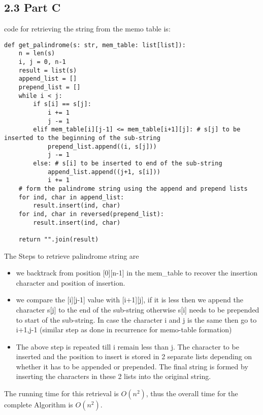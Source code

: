 \documentclass[12pt]{article}
\begin{document}
\subsection*{2.3 Part C}
\vspace{10pt}
code for retrieving the string from the memo table is:
\begin{verbatim}
def get_palindrome(s: str, mem_table: list[list]):
    n = len(s) 
    i, j = 0, n-1
    result = list(s)
    append_list = []
    prepend_list = []
    while i < j:
        if s[i] == s[j]:
            i += 1
            j -= 1
        elif mem_table[i][j-1] <= mem_table[i+1][j]: # s[j] to be inserted to the beginning of the sub-string
            prepend_list.append((i, s[j]))
            j -= 1
        else: # s[i] to be inserted to end of the sub-string
            append_list.append((j+1, s[i]))
            i += 1
    # form the palindrome string using the append and prepend lists
    for ind, char in append_list:
        result.insert(ind, char)
    for ind, char in reversed(prepend_list):
        result.insert(ind, char)

    return "".join(result)
\end{verbatim}
The Steps to retrieve palindrome string are 
\begin{itemize}
  \item we backtrack from position [0][n-1] in the mem\_table to recover the insertion character and position of insertion. 
  \item we compare the [i][j-1] value with [i+1][j], if it is less then we append the character s[j] to the end of the sub-string otherwise s[i] needs to be prepended to start of the sub-string. In case the character i and j is the same then go to i+1,j-1 (similar step as done in recurrence for memo-table formation)
  \item The above step is repeated till i remain less than j. The character to be inserted and the position to insert is stored in 2 separate lists depending on whether it has to be appended or prepended. The final string is formed by inserting the characters in these 2 lists into the original string.
\end{itemize}

The running time for this retrieval is \(O(n^2)\), thus the overall time for the complete Algorithm is \(O(n^2)\).
\end{document}
